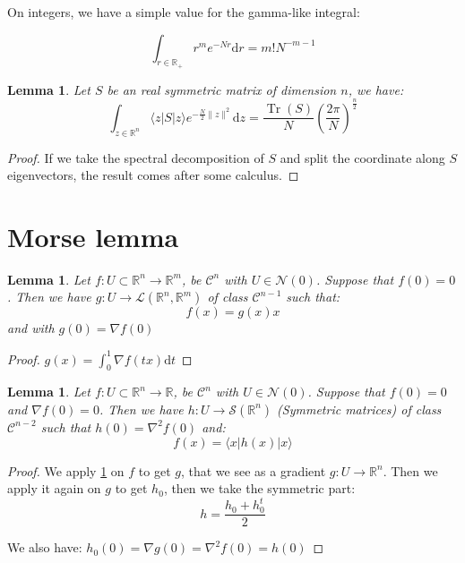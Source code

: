 \documentclass[10pt,a4paper]{report}
\theoremstyle{plain}
\newtheorem{lem}[thm]{Lemma}
\theoremstyle{definition}
\theoremstyle{remark}
\newcommand{\R}{\ensuremath{\mathbb{R}}}
\newcommand{\ket}[1]{|#1\rangle}
\newcommand{\bra}[1]{\langle#1|}
\newcommand{\dd}{\mathrm{d}}
\DeclareMathOperator{\Tr}{Tr}
\newcommand{\class}[1]{{\mathscr{C}^{#1}}}
\begin{document}
On integers, we have a simple value for the gamma-like integral:

\begin{equation}\label{eqn:gamma}
  \int_{r \in\R_+} r^{m} e^{- N r} \dd r = m! N^{-m-1}
\end{equation}



\begin{lem}\label{lem:gausssymtr}
  Let $S$ be an real symmetric matrix of dimension $n$, we have:
  \[\int_{z \in \R^n} \bra z S \ket z e^{-\frac N 2 \|z\|^2} \dd z =
    \frac{\Tr(S)}N {\left(\frac
        {2\pi}{N}\right)}^{\frac n 2} \]
\end{lem}
\begin{proof} If we take the spectral decomposition of $S$ and split the
  coordinate along $S$ eigenvectors, the result comes after some calculus.
\end{proof}

\section{Morse lemma}

\begin{lem}\label{lem:dec}
  Let $f : U \subset \R^n \to \R^m$, be $\class{n}$ with $U \in \mathcal{N}(0)$.
  Suppose that $f(0) = 0$. Then we have $g : U \to \mathcal{L}(\R^n,\R^m)$ of
  class $\class {n-1}$ such
  that:
  \[f(x) = g(x) x\]
  and with $g(0) = \nabla f(0)$
\end{lem}

\begin{proof}
  $g(x) = \int_0^1 \nabla f(tx) \dd t$
\end{proof}

\begin{lem}\label{lem:dec2}
  Let $f : U \subset \R^n \to \R$, be $\class{n}$ with $U \in \mathcal{N}(0)$.
  Suppose that $f(0) = 0$ and $\nabla f(0) = 0$.
  Then we have $h : U \to \mathcal{S}(\R^n)$ (Symmetric matrices) of class
  $\class {n-2}$ such
  that $h(0) = \nabla^2 f(0)$ and:
  \[f(x) = \bra x h(x) \ket x\]
\end{lem}

\begin{proof}
  We apply \cref{lem:dec} on $f$ to get $g$, that we see as a gradient $g :U \to
  \R^n$. Then we apply it again on $g$ to get $h_0$, then we take the symmetric part:
  \[h = \frac{h_0 + h_0^t}2\]

  We also have: $h_0(0) = \nabla g(0) = \nabla^2 f(0) = h(0)$
\end{proof}
\end{document}

